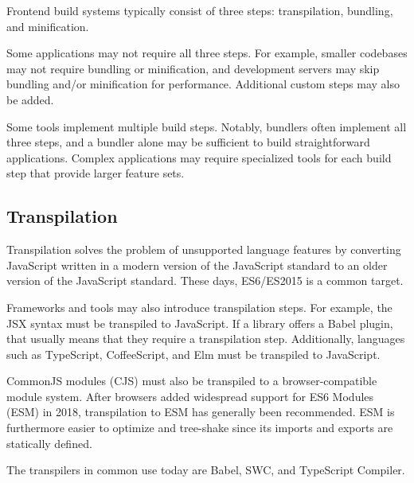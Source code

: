 \documentclass{article}
\begin{document}
Frontend build systems typically consist of three steps: transpilation, bundling, and minification.

Some applications may not require all three steps. For example, smaller codebases may not require
bundling or minification, and development servers may skip bundling and/or minification for
performance. Additional custom steps may also be added.

Some tools implement multiple build steps. Notably, bundlers often implement all three steps, and a
bundler alone may be sufficient to build straightforward applications. Complex applications may
require specialized tools for each build step that provide larger feature sets.

\subsection{Transpilation}

Transpilation solves the problem of unsupported language features by converting JavaScript written
in a modern version of the JavaScript standard to an older version of the JavaScript standard. These
days, ES6/ES2015 is a common target.

Frameworks and tools may also introduce transpilation steps. For example, the JSX syntax must be
transpiled to JavaScript. If a library offers a Babel plugin, that usually means that they require a
transpilation step. Additionally, languages such as TypeScript, CoffeeScript, and Elm must be
transpiled to JavaScript.

CommonJS modules (CJS) must also be transpiled to a browser-compatible module system. After browsers
added widespread support for ES6 Modules (ESM) in 2018, transpilation to ESM has generally been
recommended. ESM is furthermore easier to optimize and tree-shake since its imports and exports are
statically defined.

The transpilers in common use today are Babel, SWC, and TypeScript Compiler.
\end{document}
